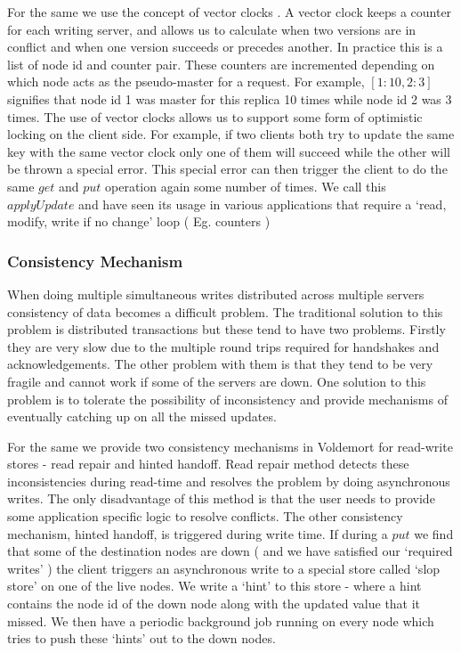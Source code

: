 \documentclass[10pt,twocolumn,preprint,natbib,authoryear]{sigplanconf}
\begin{document}
For the same we use the concept of vector clocks \cite{Time, clocks, and the ordering of events in a distributed system}. A vector clock keeps a counter for each writing server, and allows us to calculate when two versions are in conflict and when one version succeeds or precedes another. In practice this is a list of node id and counter pair. These counters are incremented depending on which node acts as the pseudo-master for a request. For example,  $[1:10,2:3]$ signifies that node id 1 was master for this replica 10 times while node id 2 was 3 times. The use of vector clocks allows us to support some form of optimistic locking on the client side. For example, if two clients both try to update the same key with the same vector clock only one of them will succeed while the other will be thrown a special error. This special error can then trigger the client to do the same $get$ and $put$ operation again some number of times. We call this $applyUpdate$ and have seen its usage in various applications that require a `read, modify, write if no change' loop ( Eg. counters )


\subsubsection {Consistency Mechanism }
\label{sec:system_architecture:system_components:consistency_mechanism}

When doing multiple simultaneous writes distributed across multiple servers consistency of data becomes a difficult problem. The traditional solution to this problem is distributed transactions but these tend to have two problems. Firstly they are very slow due to the multiple round trips required for handshakes and acknowledgements. The other problem with them is that they tend to be very fragile and cannot work if some of the servers are down. One solution to this problem is to tolerate the possibility of inconsistency and provide mechanisms of eventually catching up on all the missed updates. 

For the same we provide two consistency mechanisms in Voldemort for read-write stores - read repair and hinted handoff. Read repair method detects these inconsistencies during read-time and resolves the problem by doing asynchronous writes. The only disadvantage of this method is that the user needs to provide some application specific logic to resolve conflicts. The other consistency mechanism, hinted handoff, is triggered during write time. If during a $put$ we find that some of the destination nodes are down ( and we have  satisfied our `required writes' ) the client triggers an asynchronous write to a special store called `slop store' on one of the live nodes. We write a `hint' to this store - where a hint contains the node id of the down node along with the updated value that it missed. We then have a periodic background job running on every node which tries to push these `hints' out to the down nodes.
\end{document}
